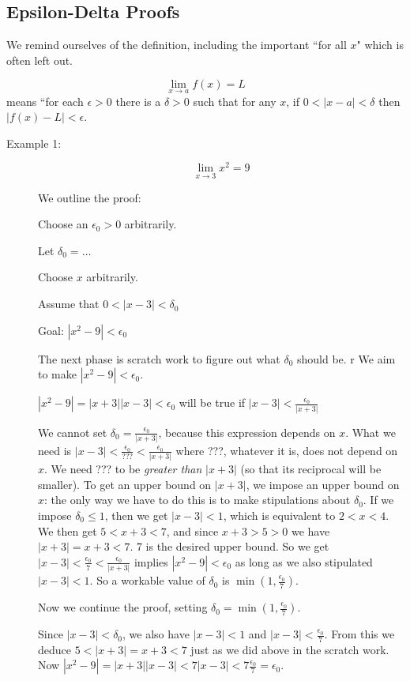 \documentclass[12pt]{article}
\begin{document}
\subsection{Epsilon-Delta Proofs}

We remind ourselves of the definition, including the important ``for all $x$" which is often left out.

$$\lim_{x \rightarrow a}f(x)=L$$ means ``for each $\epsilon >0$ there is a $\delta>0$ such that for any $x$, if $0<|x-a|<\delta$ then $|f(x)-L|<\epsilon$.

\begin{description}

\item[Example 1:]  $$\lim_{x\rightarrow 3} x^2=9$$

We outline the proof:

Choose an $\epsilon_0>0$ arbitrarily.

Let $\delta_0 = \ldots$

Choose $x$ arbitrarily.

Assume that $0<|x-3|<\delta_0$

Goal:  $|x^2-9|<\epsilon_0$

The next phase is scratch work to figure out what $\delta_0$ should be.
r
We aim to make $|x^2-9|<\epsilon_0$.

$|x^2-9| = |x+3||x-3| < \epsilon_0$ will be true if $|x-3|<\frac{\epsilon_0}{|x+3|}$

We  cannot set $\delta_0=\frac{\epsilon_0}{|x+3|}$, because this expression depends on $x$.  What we need is
$|x-3|< \frac{\epsilon_0}{???}< \frac{\epsilon_0}{|x+3|}$ where ???, whatever it is, does not depend on $x$.
We need ??? to be {\em greater than\/} $|x+3|$ (so that its reciprocal will be smaller).  To get an upper bound on $|x+3|$,
we impose an upper bound on $x$:  the only way we have to do this is to make stipulations about $\delta_0$.
If we impose $\delta_0 \leq 1$, then we get $|x-3|<1$, which is equivalent to $2<x<4$.  We then get $5 <x+3<7$,
and since $x+3>5>0$ we have $|x+3|=x+3<7$.  7 is the desired upper bound.  So we get $|x-3|< \frac{\epsilon_0}{7}< \frac{\epsilon_0}{|x+3|}$ implies $|x^2-9|<\epsilon_0$ as long as we also stipulated $|x-3|<1$.  So a workable value
of $\delta_0$ is $\min(1,\frac{\epsilon_0}7)$.

Now we continue the proof, setting $\delta_0 = \min(1,\frac{\epsilon_0}7)$.  

Since $|x-3|<\delta_0$, we also have $|x-3|<1$ and $|x-3|<\frac{\epsilon_0}7$.  From this we deduce $5<|x+3|=x+3<7$ just as we did above in the scratch work.  Now $|x^2-9|=|x+3||x-3|<7|x-3|<7\frac{\epsilon_0}7=\epsilon_0$.


\end{description}
\end{document}
